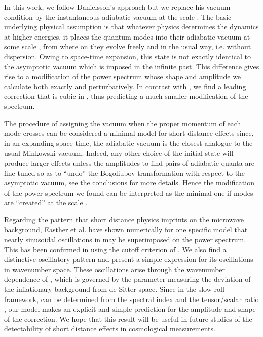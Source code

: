 \documentclass[a4paper,aps,prd,preprint,groupedaddress,nofootinbib]{revtex4}
\begin{document}
In this work, we follow Danielsson's approach but we replace his
vacuum condition  by the instantaneous adiabatic vacuum at the scale
\coordHE{}.  The basic underlying physical assumption is that whatever
physics determines the dynamics at higher energies, it places the quantum
modes into their adiabatic vacuum at  some scale \coordHE{}, from where on they evolve freely and in the usual way,
i.e. without dispersion.  Owing to space-time expansion, this state is
not exactly identical to the asymptotic vacuum which is imposed in the
infinite past. This difference gives rise to a modification of the
power spectrum whose shape and amplitude we calculate both exactly and
perturbatively. In contrast with \cite{D02,Eea02}, we find a leading
correction that is cubic in \myHighlight{$\sigma$}\coordHE{}, thus predicting a much smaller
modification of the spectrum.

The procedure of assigning the vacuum when the proper momentum of each
mode crosses \coordHE{} can be considered a minimal model for short distance
effects since, in an expanding space-time, 
the adiabatic vacuum is the closest analogue to the
usual Minkowski vacuum.  Indeed, any other
choice of the initial state will  produce larger effects  unless
the amplitudes to find pairs of adiabatic quanta are fine tuned so as
to ``undo'' the Bogoliubov transformation with respect to the
asymptotic  vacuum, see the conclusions for more details.  Hence the
modification of the power spectrum we found  can be interpreted as the
minimal one if modes are ``created'' at the scale \coordHE{}.

Regarding the pattern that short distance physics
imprints on the microwave background, Easther et al. \cite{Eea01b}
have shown numerically for one specific model that nearly sinusoidal
oscillations in \coordHE{} may be superimposed on the power
spectrum. This has been confirmed in \cite{Eea02} using the cutoff
criterion of \cite{D02}. We also find a distinctive oscillatory
pattern and present a simple expression for its oscillations in
wavenumber space. These oscillations arise through the wavenumber
dependence of \myHighlight{$\sigma$}\coordHE{}, which is governed by the parameter \myHighlight{$\epsilon$}\coordHE{}    
measuring the deviation of the inflationary background from de
Sitter space. Since in the slow-roll framework, \myHighlight{$\epsilon$}\coordHE{} can be
determined from the spectral index and the tensor/scalar ratio
\cite{K98b}, our model makes an explicit and  
simple prediction for the amplitude and shape of the correction. We
hope that this result will be useful in future studies of the
detectability of short distance effects in cosmological measurements.
\end{document}
